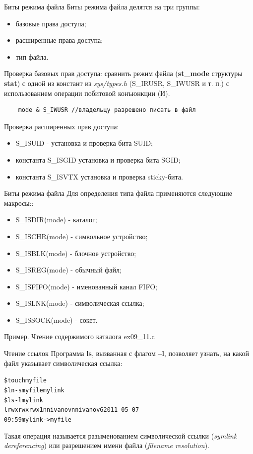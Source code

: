 \documentclass[xcolor=table]{beamer}
\begin{document}
\begin{frame}[fragile]{Биты режима файла}
	Биты режима файла делятся на три группы:
	\begin{itemize}
		\item базовые права доступа;
		\item расширенные права доступа;
		\item тип файла.
	\end{itemize}
	Проверка базовых прав доступа: сравнить режим файла (\textbf{st\_mode} структуры \textbf{stat}) с одной из констант из \textit{sys/types.h} (S\_IRUSR, S\_IWUSR и т. п.) с использованием операции побитовой конъюнкции (И).
	\begin{verbatim}
	mode & S_IWUSR //владельцу разрешено писать в файл
	\end{verbatim}
	Проверка расширенных прав доступа:
	\begin{itemize}
		\item S\_ISUID - установка и проверка бита SUID;
		\item константа S\_ISGID установка и проверка бита SGID;
		\item константа S\_ISVTX установка и проверка sticky-бита.
	\end{itemize}
\end{frame}

\begin{frame}[fragile]{Биты режима файла}
	Для определения типа файла применяются следующие макросы::
	\begin{itemize}
		\item S\_ISDIR(mode) - каталог;
		\item S\_ISCHR(mode) - символьное устройство;
		\item S\_ISBLK(mode) - блочное устройство;
		\item S\_ISREG(mode) - обычный файл;
		\item S\_ISFIFO(mode) - именованный канал FIFO;
		\item S\_ISLNK(mode) - символическая ссылка;
		\item S\_ISSOCK(mode) - сокет.
	\end{itemize}
	\begin{block}{Пример. Чтение содержимого каталога}
		ex09\_11.c
	\end{block}
\end{frame}

\begin{frame}[fragile]{Чтение ссылок}
Программа \textbf{ls}, вызванная с флагом \textbf{–l}, позволяет узнать, на какой файл указывает символическая ссылка:
	\begin{alltt}
		\$ touch myfile
		\$ ln -s myfile mylink
		\$ ls -l mylink
		lrwxrwxrwx 1 nnivanov nnivanov 6 2011-05-07 
		                     09:59 mylink -> myfile
	\end{alltt}
	Такая операция называется разыменованием символической ссылки (\textit{symlink dereferencing}) или разрешением имени файла (\textit{filename resolution}).
\end{frame}
\end{document}
